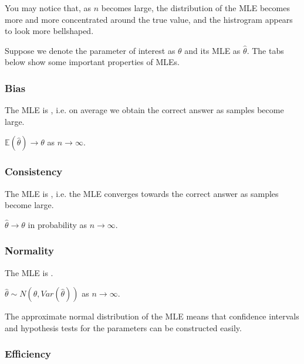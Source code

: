 \documentclass[letterpaper,10pt,english]{jupyterBook}
\begin{document}
\noindent{}

\sphinxAtStartPar
You may notice that, as \(n\) becomes large, the distribution of the MLE becomes more and more concentrated around the true value, and the histrogram appears to look more bell\sphinxhyphen{}shaped.

\sphinxAtStartPar
Suppose we denote the parameter of interest as \(\theta\) and its MLE as \(\hat{\theta}\). The tabs below show some important properties of MLEs.
\subsubsection*{Bias}



\sphinxAtStartPar
The MLE is , i.e. on average we obtain the correct answer as samples become large.

\sphinxAtStartPar
\(\mathbb{E}(\hat{\theta}) \rightarrow \theta\) as \(n \rightarrow \infty\).


\subsubsection*{Consistency}



\sphinxAtStartPar
The MLE is , i.e. the MLE converges towards the correct answer as samples become large.

\sphinxAtStartPar
\(\hat{\theta} \rightarrow \theta\) in probability as \(n \rightarrow \infty\).


\subsubsection*{Normality}



\sphinxAtStartPar
The MLE is .

\sphinxAtStartPar
\(\hat{\theta} \sim N(\theta ,Var(\hat{\theta} ))\) as \(n \rightarrow \infty\).

\sphinxAtStartPar
The approximate normal distribution of the MLE means that confidence intervals and hypothesis tests for the parameters can be constructed easily.


\subsubsection*{Efficiency}
\end{document}
